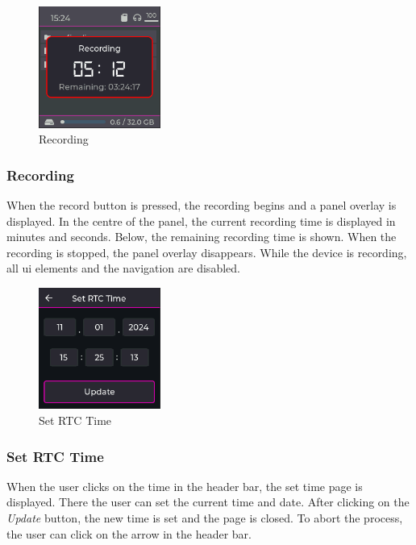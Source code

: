 \begin{minipage}{\linewidth}
	\begin{figure}
		\vspace{-0.6cm}
		\includegraphics[width=4cm]{images/4_design_acquisition_system/gui/04_recording.png}
		\centering
		\caption{Recording}
		\label{fig:acquisition_system_gui_recording}
	\end{figure}
	\subsubsection{Recording}
	When the record button is pressed, the recording begins and a panel overlay is displayed.
	In the centre of the panel, the current recording time is displayed in minutes and seconds.
	Below, the remaining recording time is shown.
	When the recording is stopped, the panel overlay disappears.
	While the device is recording, all \acrshort{ui} elements and the navigation are disabled.
\end{minipage}
\vspace{1.8cm}

\begin{minipage}{\linewidth}
	\begin{figure}
		\vspace{-0.6cm}
		\includegraphics[width=4cm]{images/4_design_acquisition_system/gui/05_set_time.png}
		\centering
		\caption{Set RTC Time}
		\label{fig:acquisition_system_gui_set_time}
	\end{figure}
	\subsubsection{Set RTC Time}
	When the user clicks on the time in the header bar, the set time page is displayed.
	There the user can set the current time and date.
	After clicking on the \textit{Update} button, the new time is set and the page is closed.
	To abort the process, the user can click on the arrow in the header bar.
\end{minipage}
\vspace{1.8cm}



